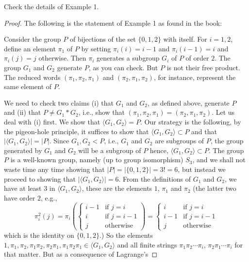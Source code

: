 \begin{problem}[Munkres \S68, Ex.\,1]
Check the details of Example 1.
\end{problem}
\begin{proof}
The following is the statement of Example 1 as found in the book:
\begin{example*}[1]
Consider the group $P$ of bijections of the set $\{0,1,2\}$ with
itself. For $i=1,2$, define an element $\pi_1$ of $P$ by setting
$\pi_i(i)=i-1$ and $\pi_i(i-1)=i$ and $\pi_i(j)=j$ otherwise. Then $\pi_i$
generates a subgroup $G_i$ of $P$ of order $2$. The group $G_1$ and $G_2$
generate $P$, as you can check. But $P$ is not their free product. The
reduced words $(\pi_1,\pi_2,\pi_1)$ and $(\pi_2,\pi_1,\pi_2)$, for
instance, represent the same element of $P$.
\end{example*}
We need to check two claims (i) that $G_1$ and $G_2$, as defined above,
generate $P$ and (ii) that $P\neq G_1*G_2$, i.e., show that
$(\pi_1,\pi_2,\pi_1)=(\pi_2,\pi_1,\pi_2)$. Let us deal with (i) first. We
show that $\langle G_1,G_2 \rangle=P$. Our strategy is the following, by
the pigeon-hole principle, it suffices to show that $\langle  G_1,G_2
\rangle\subset P$ and that $|\langle G_1,G_2\rangle|=|P|$. Since
$G_1,G_2<P$, i.e., $G_1$ and $G_2$ are subgroups of $P$, the group
generated by $G_1$ and $G_2$ will be a subgroup of $P$ hence, $\langle
G_1,G_2 \rangle\subset P$. The group $P$ is a well-known group, namely (up
to group isomorphism) $S_3$, and we shall not waste time any time showing
that $|P|=|\{0,1,2\}|=3!=6$, but instead we proceed to showing that
$|\langle G_1,G_2 \rangle|=6$. From the definitions of $G_1$ and $G_2$, we
have at least $3$ in $\langle  G_1,G_2 \rangle$, these are the elements
$1$, $\pi_1$ and $\pi_2$ (the latter two have order $2$, e.g.,
\[
\pi_i^2(j)=
\pi_i\left(
\begin{cases}
i-1&\text{if $j=i$}\\
i&\text{if $j=i-1$}\\
j&\text{otherwise}
\end{cases}\right)
=
\begin{cases}
i&\text{if $j=i$}\\
i-1&\text{if $j=i-1$}\\
j&\text{otherwise}
\end{cases}
\]
which is the identity on $\{0,1,2\}$.) So the elements
$1,\pi_1,\pi_2,\pi_1\pi_2,\pi_2\pi_1,\pi_1\pi_2\pi_1\in\langle
G_1,G_2\rangle$ and all finite strings $\pi_1\pi_2\cdots\pi_i$,
$\pi_2\pi_1\cdots\pi_i$ for that matter. But as a consequence of Lagrange's

\end{proof}
